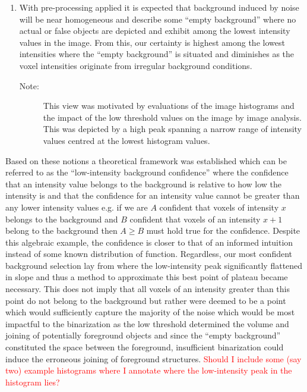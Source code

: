 \begin{enumerate}
    \item With pre-processing applied it is expected that background induced by noise will be near homogeneous and describe some ``empty background'' where no actual or false objects are depicted and exhibit among the lowest intensity values in the image. From this, our certainty is highest among the lowest intensities where the ``empty background'' is situated and diminishes as the voxel intensities originate from irregular background conditions.
    \begin{description}
        \item[Note:] This view was motivated by evaluations of the image histograms and the impact of the low threshold values on the image by image analysis. This was depicted by a high peak spanning a narrow range of intensity values centred at the lowest histogram values.  
    \end{description}
\end{enumerate}
Based on these notions a theoretical framework was established which can be referred to as the ``low-intensity background confidence'' where the confidence that an intensity value belongs to the background is relative to how low the intensity is and that the confidence for an intensity value cannot be greater than any lower intensity values e.g. if we are $A$ confident that voxels of intensity $x$ belongs to the background and $B$ confident that voxels of an intensity $x+1$ belong to the background then $A \geq B$ must hold true for the confidence. Despite this algebraic example, the confidence is closer to that of an informed intuition instead of some known distribution of function. Regardless, our most confident background selection lay from where the low-intensity peak significantly flattened in slope and thus a method to approximate this best point of plateau became necessary. This does not imply that all voxels of an intensity greater than this point do not belong to the background but rather were deemed to be a point which would sufficiently capture the majority of the noise which would be most impactful to the binarization as the low threshold determined the volume and joining of potentially foreground objects and since the ``empty background'' constituted the space between the foreground, insufficient binarization could induce the erroneous joining of foreground structures.
\textcolor{red}{Should I include some (say two) example histograms where I annotate where the low-intensity peak in the histogram lies?}
\iffalse
